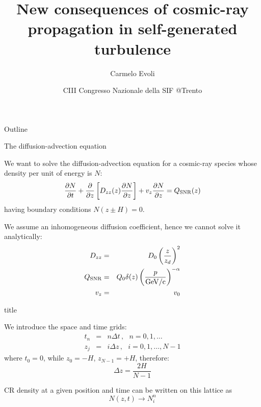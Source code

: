 \documentclass[9pt]{beamer}
\author[C.~Evoli]{Carmelo Evoli}
\institute[GSSI]{Gran Sasso Science Institute @L'Aquila}
\title[CR in self-generated turbulence]{New consequences of cosmic-ray propagation in self-generated turbulence}
\date[CIII Congresso SIF 2017]{CIII Congresso Nazionale della SIF @Trento}
\begin{document}
\begin{frame}
\titlepage
\end{frame}

\begin{frame}{Outline}
\tableofcontents
\end{frame}

\begin{frame}{The diffusion-advection equation}

We want to solve the diffusion-advection equation for a cosmic-ray species whose density per unit of energy is $N$:
%
\begin{equation*}
\frac{\partial N}{\partial t} 
+\frac{\partial}{\partial z} \left[ D_{zz}(z) \frac{\partial N}{\partial z} \right]
+v_z \frac{\partial N}{\partial z}
= Q_{\rm SNR}(z)
\end{equation*}
%
having boundary conditions $N(z \pm H) = 0$.

We assume an {\color{orange}inhomogeneous} diffusion coefficient, hence we cannot solve it analytically:
%
\begin{eqnarray*}
D_{zz} & = & D_0 \left( \frac{z}{z_d} \right)^{2} \\
Q_{\rm SNR} & = & Q_0 \delta(z) \left( \frac{p}{\rm GeV/c} \right)^{-\alpha} \\
v_z & = & v_0
\end{eqnarray*}
\end{frame}

\begin{frame}{title}

We introduce the space and time grids: 
%
\begin{eqnarray*}
t_n & = & n \Delta t \, , \,\,\,\,  n = 0, 1, \dots  \\ 
z_j & = & i \Delta z \, , \,\,\,\,  i = 0, 1, \dots, N-1
\end{eqnarray*}
%
where
%
$t_0 = 0$, while $z_0 = -H$, $z_{N-1} = +H$, therefore:
%
\begin{equation*}
\Delta z = \frac{2H}{N - 1}
\end{equation*}

CR density at a given position and time can be written on this lattice as
%
\begin{equation*}
N(z, t) \rightarrow N_i^n
\end{equation*}

\end{frame}
\end{document}
